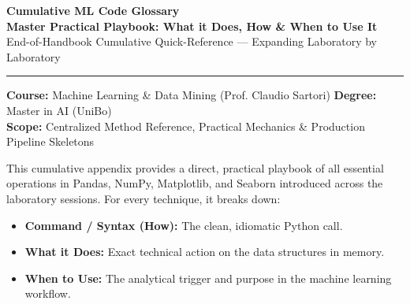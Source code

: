 \documentclass[11pt,a4paper]{article}
\begin{document}
{}

\begin{tcolorbox}[
    colback=blue!5!white,
    colframe=blue!65!black,
    arc=3mm,
    boxrule=1.2pt,
    left=14pt, right=14pt, top=12pt, bottom=12pt
]
    {\Huge\bfseries\color{blue!75!black} Cumulative ML Code Glossary}\\[0.3em]
    {\LARGE\bfseries Master Practical Playbook: What it Does, How \& When to Use It}\\[0.4em]
    {\normalsize\textsf{End-of-Handbook Cumulative Quick-Reference --- Expanding Laboratory by Laboratory}}\par
    \vspace{0.8em}
    \hrule
    \vspace{0.6em}
    \footnotesize
    \textbf{Course:} Machine Learning \& Data Mining (Prof. Claudio Sartori) \hfill \textbf{Degree:} Master in AI (UniBo)\\
    \textbf{Scope:} Centralized Method Reference, Practical Mechanics \& Production Pipeline Skeletons
\end{tcolorbox}
\vspace{0.5em}

This cumulative appendix provides a direct, practical playbook of all essential operations in Pandas, NumPy, Matplotlib, and Seaborn introduced across the laboratory sessions. For every technique, it breaks down:
\begin{itemize}[leftmargin=*]
    \item \textbf{Command / Syntax (How):} The clean, idiomatic Python call.
    \item \textbf{What it Does:} Exact technical action on the data structures in memory.
    \item \textbf{When to Use:} The analytical trigger and purpose in the machine learning workflow.
\end{itemize}

{}
\end{document}
